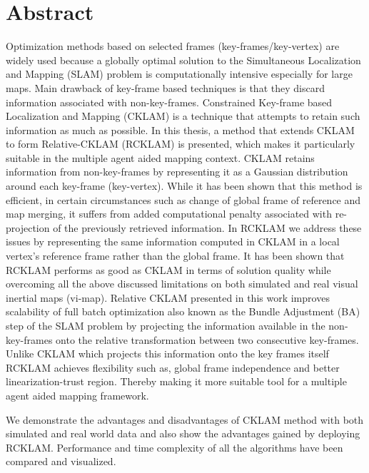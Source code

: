 \chapter*{Abstract}

Optimization methods based on selected frames (key-frames/key-vertex) are widely used because a globally optimal solution to the Simultaneous Localization and Mapping (SLAM) problem is computationally intensive especially for large maps. Main drawback of key-frame based techniques is that they discard information associated with non-key-frames. Constrained Key-frame based Localization and Mapping (CKLAM) is a technique that attempts to retain such information as much as possible. In this thesis, a method that extends CKLAM to form Relative-CKLAM (RCKLAM) is presented, which makes it particularly suitable in the multiple agent aided mapping context. CKLAM retains information from non-key-frames by representing it as a Gaussian distribution around each key-frame (key-vertex). While it has been shown that this method is efficient, in certain circumstances such as change of global frame of reference and map merging, it suffers from added computational penalty associated with re-projection of the previously retrieved information. In RCKLAM we address these issues by representing the same information computed in CKLAM in a local vertex's reference frame rather than the global frame. It has been shown that RCKLAM performs as good as CKLAM in terms of solution quality while overcoming all the above discussed limitations on both simulated and real visual inertial maps (vi-map). Relative CKLAM presented in this work improves scalability of full batch optimization also known as the Bundle Adjustment (BA) step of the SLAM problem by projecting the information available in the non-key-frames onto the relative transformation between two consecutive key-frames. Unlike CKLAM which projects this information onto the key frames itself RCKLAM achieves flexibility such as, global frame independence and better linearization-trust region. Thereby making it more suitable tool for a multiple agent aided mapping framework.

We demonstrate the advantages and disadvantages of CKLAM method with both simulated and real world data and also show the advantages gained by deploying RCKLAM. Performance and time complexity of all the algorithms have been compared and visualized. 